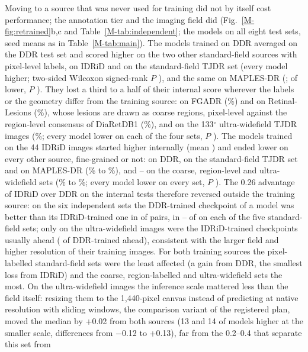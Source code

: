 Moving to a source that was never used for training did not by itself cost performance; the annotation tier and the imaging field did (Fig.~\ref{M-fig:retrained}b,c and Table~\ref{M-tab:independent}; the  models on all eight test sets, seed means as in Table~\ref{M-tab:main}). The models trained on DDR averaged  \mAUPR{} on the DDR test set and scored higher on the two other standard-field sources with pixel-level labels,  on IDRiD and  on the standard-field TJDR set (every model higher; two-sided Wilcoxon signed-rank $P$ ), and the same on MAPLES-DR (;  of  lower, $P$ ). They lost a third to a half of their internal score wherever the labels or the geometry differ from the training source:  on FGADR (\%) and  on Retinal-Lesions (\%), whose lesions are drawn as coarse regions,  pixel-level \mAUPR{} against the region-level consensus of DiaRetDB1 (\%), and  on the 133$^\circ$ ultra-widefield TJDR images (\%; every model lower on each of the four sets, $P$ ). The models trained on the 44 IDRiD images started higher internally (mean ) and ended lower on every other source, fine-grained or not:  on DDR,  on the standard-field TJDR set and  on MAPLES-DR (\% to \%), and -- on the coarse, region-level and ultra-widefield sets (\% to \%; every model lower on every set, $P$ ). The 0.26 advantage of IDRiD over DDR on the internal tests therefore reversed outside the training source: on the six independent sets the DDR-trained checkpoint of a model was better than its IDRiD-trained one in  of  pairs, in -- of  on each of the five standard-field sets; only on the ultra-widefield images were the IDRiD-trained checkpoints usually ahead ( of  DDR-trained ahead), consistent with the larger field and higher resolution of their training images. For both training sources the pixel-labelled standard-field sets were the least affected (a gain from DDR, the smallest loss from IDRiD) and the coarse, region-labelled and ultra-widefield sets the most. On the ultra-widefield images the inference scale mattered less than the field itself: resizing them to the 1,440-pixel canvas instead of predicting at native resolution with sliding windows, the comparison variant of the registered plan, moved the median \mAUPR{} by +0.02 from both sources (13 and 14 of  models higher at the smaller scale, differences from $-$0.12 to +0.13), far from the 0.2--0.4 that separate this set from 